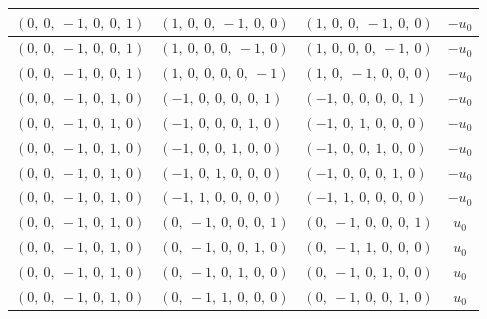 \documentclass[11pt]{article}
\theoremstyle{definition}
\begin{document}
\begin{longtable}{|l|l|l|c|}
    \hline
    $\left( 0, \  0, \  -1, \  0, \  0, \  1\right)$ & $\left( 1, \  0, \  0, \  -1, \  0, \  0\right)$ & $\left( 1, \  0, \  0, \  -1, \  0, \  0\right)$ & $- u_{0}$ \\
    \hline
    $\left( 0, \  0, \  -1, \  0, \  0, \  1\right)$ & $\left( 1, \  0, \  0, \  0, \  -1, \  0\right)$ & $\left( 1, \  0, \  0, \  0, \  -1, \  0\right)$ & $- u_{0}$ \\
    \hline
    $\left( 0, \  0, \  -1, \  0, \  0, \  1\right)$ & $\left( 1, \  0, \  0, \  0, \  0, \  -1\right)$ & $\left( 1, \  0, \  -1, \  0, \  0, \  0\right)$ & $- u_{0}$ \\
    \hline
    $\left( 0, \  0, \  -1, \  0, \  1, \  0\right)$ & $\left( -1, \  0, \  0, \  0, \  0, \  1\right)$ & $\left( -1, \  0, \  0, \  0, \  0, \  1\right)$ & $- u_{0}$ \\
    \hline
    $\left( 0, \  0, \  -1, \  0, \  1, \  0\right)$ & $\left( -1, \  0, \  0, \  0, \  1, \  0\right)$ & $\left( -1, \  0, \  1, \  0, \  0, \  0\right)$ & $- u_{0}$ \\
    \hline
    $\left( 0, \  0, \  -1, \  0, \  1, \  0\right)$ & $\left( -1, \  0, \  0, \  1, \  0, \  0\right)$ & $\left( -1, \  0, \  0, \  1, \  0, \  0\right)$ & $- u_{0}$ \\
    \hline
    $\left( 0, \  0, \  -1, \  0, \  1, \  0\right)$ & $\left( -1, \  0, \  1, \  0, \  0, \  0\right)$ & $\left( -1, \  0, \  0, \  0, \  1, \  0\right)$ & $- u_{0}$ \\
    \hline
    $\left( 0, \  0, \  -1, \  0, \  1, \  0\right)$ & $\left( -1, \  1, \  0, \  0, \  0, \  0\right)$ & $\left( -1, \  1, \  0, \  0, \  0, \  0\right)$ & $- u_{0}$ \\
    \hline
    $\left( 0, \  0, \  -1, \  0, \  1, \  0\right)$ & $\left( 0, \  -1, \  0, \  0, \  0, \  1\right)$ & $\left( 0, \  -1, \  0, \  0, \  0, \  1\right)$ & $u_{0}$ \\
    \hline
    $\left( 0, \  0, \  -1, \  0, \  1, \  0\right)$ & $\left( 0, \  -1, \  0, \  0, \  1, \  0\right)$ & $\left( 0, \  -1, \  1, \  0, \  0, \  0\right)$ & $u_{0}$ \\
    \hline
    $\left( 0, \  0, \  -1, \  0, \  1, \  0\right)$ & $\left( 0, \  -1, \  0, \  1, \  0, \  0\right)$ & $\left( 0, \  -1, \  0, \  1, \  0, \  0\right)$ & $u_{0}$ \\
    \hline
    $\left( 0, \  0, \  -1, \  0, \  1, \  0\right)$ & $\left( 0, \  -1, \  1, \  0, \  0, \  0\right)$ & $\left( 0, \  -1, \  0, \  0, \  1, \  0\right)$ & $u_{0}$ \\

\end{longtable}
\end{document}
